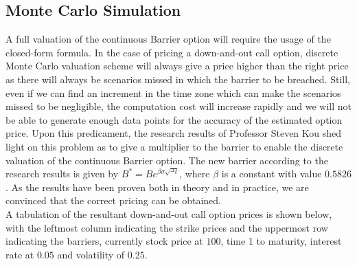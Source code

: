 \subsection{Monte Carlo Simulation}
A full valuation of the continuous Barrier option will require the usage of the closed-form formula. In the case of pricing a down-and-out call option, discrete Monte Carlo valuation scheme will always give a price higher than the right price as there will always be scenarios missed in which the barrier to be breached. Still, even if we can find an increment in the time zone which can make the scenarios missed to be negligible, the computation cost will increase rapidly and we will not be able to generate enough data points for the accuracy of the estimated option price. Upon this predicament, the research results of Professor Steven Kou\cite{ContinuityCorrection} shed light on this problem as to give a multiplier to the barrier to enable the discrete valuation of the continuous Barrier option. The new barrier according to the research results is given by $B^{*} = Be^{\beta \sigma \sqrt{^{\Delta}t}}$, where $\beta$ is a constant with value $0.5826$. As the results have been proven both in theory and in practice, we are convinced that the correct pricing can be obtained.\\[1mm]
A tabulation of the resultant down-and-out call option prices is shown below, with the leftmost column indicating the strike prices and the uppermost row indicating the barriers, currently stock price at $100$, time 1 to maturity, interest rate at $0.05$ and volatility of $0.25$. 
